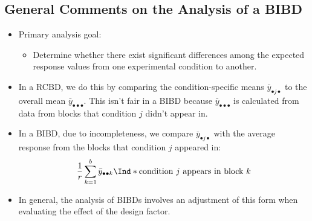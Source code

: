 \subsection*{General Comments on the Analysis of a BIBD}
\begin{itemize}
    \item Primary analysis goal:
          \begin{itemize}
              \item Determine whether there exist significant differences among the expected response values from
                    one experimental condition to another.
          \end{itemize}
    \item In a RCBD, we do this by comparing the condition-specific means $ \bar{y}_{\bullet j\bullet} $ to the overall mean $ \bar{y}_{\bullet\bullet\bullet} $.
          This isn't fair in a BIBD because $ \bar{y}_{\bullet\bullet\bullet} $ is calculated from data from blocks that condition $ j $ didn't appear in.
    \item In a BIBD, due to incompleteness, we compare $ \bar{y}_{\bullet j\bullet} $ with the average response from the blocks that
          condition $j$ appeared in:
          \[ \frac{1}{r} \sum_{k=1}^{b} \bar{y}_{\bullet\bullet k}\Ind*{\text{condition $ j $ appears in block $ k $}} \]
    \item In general, the analysis of BIBDs involves an adjustment of this form when evaluating the effect of the
          design factor.
\end{itemize}
